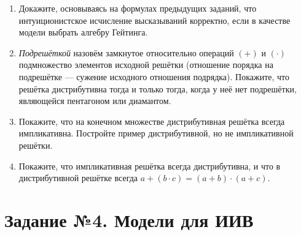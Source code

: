\documentclass[10pt,a4paper,oneside]{article}
\begin{document}
\begin{enumerate}
\item Докажите, основываясь на формулах предыдущих заданий, что интуиционистское исчисление высказываний
корректно, если в качестве модели выбрать алгебру Гейтинга.

\item \emph{Подрешёткой} назовём замкнутое относительно операций $(+)$ и $(\cdot)$ подмножество элементов исходной решётки
(отношение порядка на подрешётке --- сужение исходного отношения подрядка). 
Покажите, что решётка дистрибутивна тогда и только тогда, когда у неё нет подрешётки, являющейся пентагоном или диамантом.

\item Покажите, что на конечном множестве дистрибутивная решётка всегда импликативна. Постройте пример дистрибутивной, но не импликативной решётки.
\item Покажите, что импликативная решётка всегда дистрибутивна, и что в дистрибутивной решётке всегда $a + (b \cdot c) = (a + b) \cdot (a + c)$.

\end{enumerate}

\section*{Задание №4. Модели для ИИВ}
\end{document}
